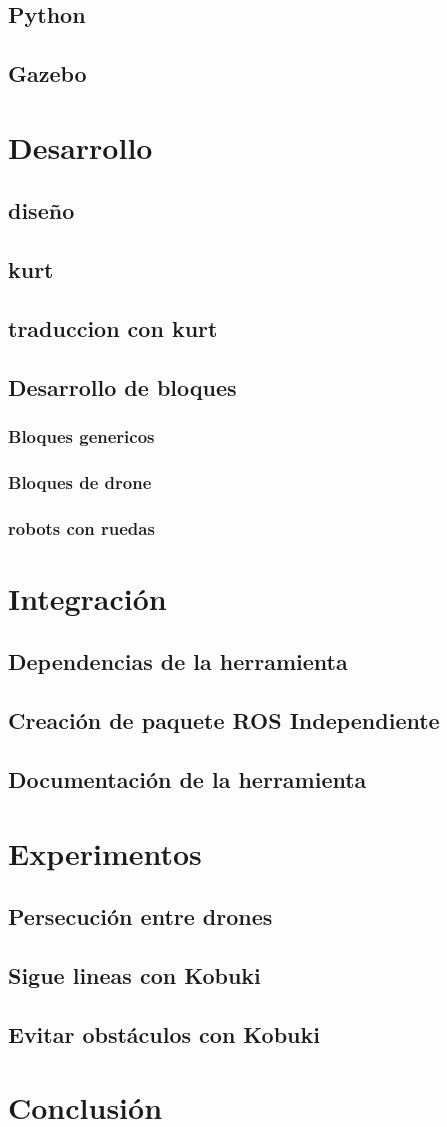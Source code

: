\documentclass{article}
\begin{document}
    \subsection{Python}
    \subsection{Gazebo}
\section{Desarrollo}
    \subsection{diseño}
    \subsection{kurt}
    \subsection{traduccion con kurt}
    \subsection{Desarrollo de bloques}
        \subsubsection{Bloques genericos}
        \subsubsection{Bloques de drone}
		\subsubsection{robots con ruedas}
\section{Integración}
    \subsection{Dependencias de la herramienta}
    \subsection{Creación de paquete ROS Independiente}
    \subsection{Documentación de la herramienta}
\section{Experimentos}
    \subsection{Persecución entre drones}
    \subsection{Sigue lineas con Kobuki}
    \subsection{Evitar obstáculos con Kobuki}
\section{Conclusión}
\end{document}
